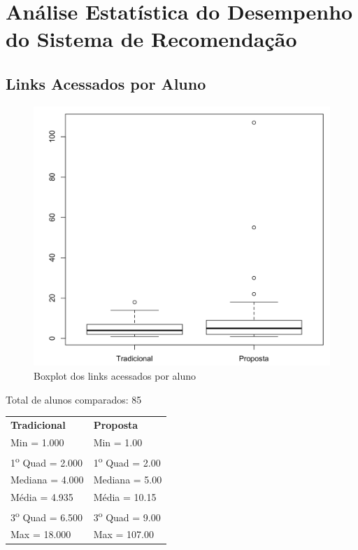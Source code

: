 \chapter{Análise Estatística do Desempenho do Sistema de Recomendação}\label{ape:analise-estatistica-do-uso}

\section{Links Acessados por Aluno}

\begin{figure}[htb]
  \caption{\label{fig:uso-sr-boxplot}Boxplot dos links acessados por aluno}
  \begin{center}
      \includegraphics[scale=0.4]{./Figuras/uso-sr-boxplot.png}
  \end{center}
\end{figure}

\noindent
Total de alunos comparados: 85

\begin{table}[h]
\begin{tabular}{p{}p{}}
  \textbf{Tradicional} & \textbf{Proposta} \\
  Min = 1.000 & Min = 1.00 \\
  1\textsuperscript{o} Quad = 2.000 & 1\textsuperscript{o} Quad = 2.00 \\
  Mediana = 4.000 & Mediana = 5.00 \\
  Média = 4.935 & Média =  10.15 \\
  3\textsuperscript{o} Quad = 6.500 & 3\textsuperscript{o} Quad = 9.00 \\
  Max = 18.000 & Max = 107.00 \\
\end{tabular}
\end{table}

